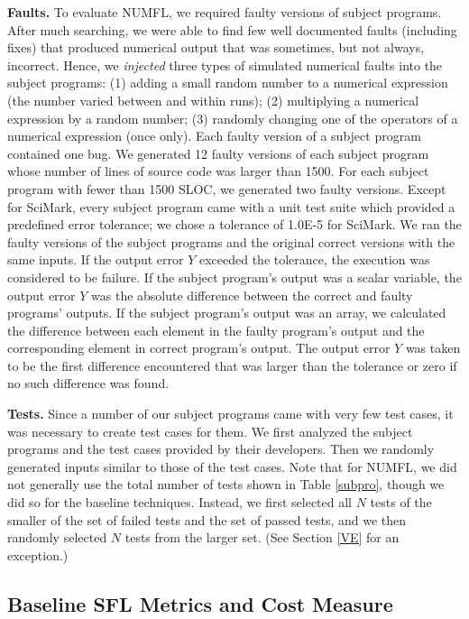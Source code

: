 \documentclass[times]{stvrauth}
\begin{document}
{\bf Faults.}  To evaluate NUMFL, we required faulty versions of subject programs.  After much searching, we were able to find few well documented faults (including fixes) that produced numerical output that was sometimes, but not always, incorrect.  Hence, we {\it injected} three types of simulated numerical faults into the subject programs: (1) adding a small random number to a numerical expression (the number varied between and within runs); (2) multiplying a numerical expression by a random number; (3) randomly changing one of the operators of a numerical expression (once only).  Each faulty version of a subject program contained one bug.  We generated 12 faulty versions of each subject program whose number of lines of source code was larger than 1500.  For each subject program with fewer than 1500 SLOC, we generated two faulty versions.  Except for SciMark, every subject program came with a unit test suite which provided a predefined error tolerance; we chose a tolerance of 1.0E-5 for SciMark.  We ran the faulty versions of the subject programs and the original correct versions with the same inputs.  If the output error $Y$ exceeded the tolerance, the execution was considered to be failure.  If the subject program's output was a scalar variable, the output error $Y$ was the absolute difference between the correct and faulty programs' outputs.  If the subject program's output was an array, we calculated the difference between each element in the faulty program's output and the corresponding element in correct program's output.  The output error $Y$ was taken to be the first difference encountered that was larger than the tolerance or zero if no such difference was found.


{\bf Tests.}  Since a number of our subject programs came with very few test cases, it was necessary to create test cases for them.  We first analyzed the subject programs and the test cases provided by their developers. Then we randomly generated inputs similar to those of the test cases. Note that for NUMFL, we did not generally use the total number of tests shown in Table \ref{subpro}, though we did so for the baseline techniques.  Instead, we first selected all $N$ tests of the smaller of the set of failed tests and the set of passed tests, and we then randomly selected $N$ tests from the larger set. (See Section \ref{VE} for an exception.)

\subsection{Baseline SFL Metrics and Cost Measure}
\end{document}
